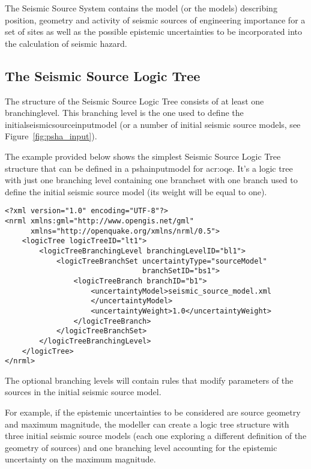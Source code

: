 The Seismic Source System contains the model (or the models) describing
position, geometry and activity of seismic sources of engineering importance
for a set of sites as well as the possible epistemic uncertainties to be
incorporated into the calculation of seismic hazard.



\subsection{The Seismic Source Logic Tree}

The structure of the Seismic Source Logic Tree consists of at least one
\gls{branchinglevel}. This branching level is the one used to define the
\gls{initialseismicsourceinputmodel} (or a number of initial seismic source
models, see Figure~\ref{fig:psha_input}).

The example provided below shows the simplest Seismic Source Logic Tree
structure that can be defined in a \gls{pshainputmodel} for \gls{acr:oqe}. It's a logic tree with just one branching level containing one \gls{branchset} with one branch used to define the initial seismic source model (its weight will be equal to one). 

\begin{verbatim}
<?xml version="1.0" encoding="UTF-8"?>
<nrml xmlns:gml="http://www.opengis.net/gml"
      xmlns="http://openquake.org/xmlns/nrml/0.5">
    <logicTree logicTreeID="lt1">
        <logicTreeBranchingLevel branchingLevelID="bl1">
            <logicTreeBranchSet uncertaintyType="sourceModel"
                                branchSetID="bs1">
                <logicTreeBranch branchID="b1">
                    <uncertaintyModel>seismic_source_model.xml
                    </uncertaintyModel>
                    <uncertaintyWeight>1.0</uncertaintyWeight>
                </logicTreeBranch>
            </logicTreeBranchSet>
        </logicTreeBranchingLevel>
    </logicTree>
</nrml>
\end{verbatim}

%

The optional branching levels will contain rules that modify parameters of the sources in the initial seismic source model.

For example, if the epistemic uncertainties to be considered are source
geometry and maximum magnitude, the modeller can create a logic tree structure with three initial seismic source models (each one exploring a different definition of the geometry of sources) and one branching level accounting for the epistemic uncertainty on the maximum magnitude.

